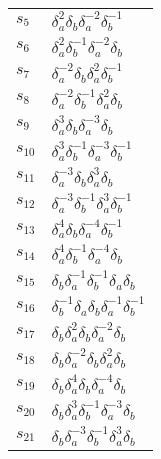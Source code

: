 \documentclass{article}
\begin{document}
\begin{center}
\begin{tabular}{ll}
$s_{5}$ & $\delta_a^{2}\delta_b^{}\delta_a^{-2}\delta_b^{-1}$ \\
$s_{6}$ & $\delta_a^{2}\delta_b^{-1}\delta_a^{-2}\delta_b^{}$ \\
$s_{7}$ & $\delta_a^{-2}\delta_b^{}\delta_a^{2}\delta_b^{-1}$ \\
$s_{8}$ & $\delta_a^{-2}\delta_b^{-1}\delta_a^{2}\delta_b^{}$ \\
$s_{9}$ & $\delta_a^{3}\delta_b^{}\delta_a^{-3}\delta_b^{}$ \\
$s_{10}$ & $\delta_a^{3}\delta_b^{-1}\delta_a^{-3}\delta_b^{-1}$ \\
$s_{11}$ & $\delta_a^{-3}\delta_b^{}\delta_a^{3}\delta_b^{}$ \\
$s_{12}$ & $\delta_a^{-3}\delta_b^{-1}\delta_a^{3}\delta_b^{-1}$ \\
$s_{13}$ & $\delta_a^{4}\delta_b^{}\delta_a^{-4}\delta_b^{-1}$ \\
$s_{14}$ & $\delta_a^{4}\delta_b^{-1}\delta_a^{-4}\delta_b^{}$ \\
$s_{15}$ & $\delta_b^{}\delta_a^{-1}\delta_b^{-1}\delta_a^{}\delta_b^{}$ \\
$s_{16}$ & $\delta_b^{-1}\delta_a^{}\delta_b^{}\delta_a^{-1}\delta_b^{-1}$ \\
$s_{17}$ & $\delta_b^{}\delta_a^{2}\delta_b^{}\delta_a^{-2}\delta_b^{}$ \\
$s_{18}$ & $\delta_b^{}\delta_a^{-2}\delta_b^{}\delta_a^{2}\delta_b^{}$ \\
$s_{19}$ & $\delta_b^{}\delta_a^{4}\delta_b^{}\delta_a^{-4}\delta_b^{}$ \\
$s_{20}$ & $\delta_b^{}\delta_a^{3}\delta_b^{-1}\delta_a^{-3}\delta_b^{}$ \\
$s_{21}$ & $\delta_b^{}\delta_a^{-3}\delta_b^{-1}\delta_a^{3}\delta_b^{}$ \\
\bottomrule
\end{tabular}
\end{center}

\thispagestyle{empty}
\end{document}
